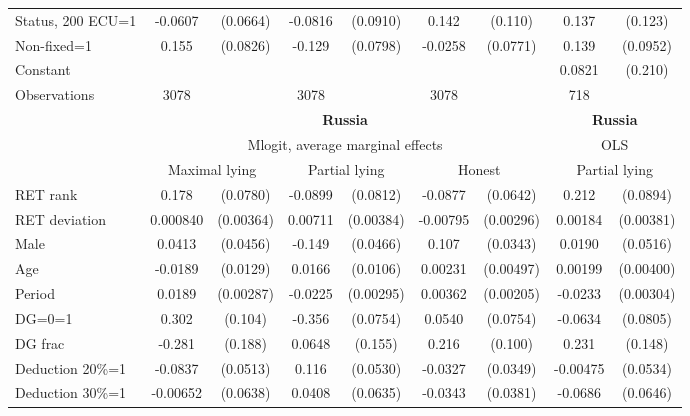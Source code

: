 \begin{tabular}{l|cccccc|cc}
Status, 200 ECU=1&  -0.0607         & (0.0664)&  -0.0816         & (0.0910)&    0.142         &  (0.110)&    0.137         &  (0.123)\\
Non-fixed=1     &    0.155\sym{*}  & (0.0826)&   -0.129         & (0.0798)&  -0.0258         & (0.0771)&    0.139         & (0.0952)\\
Constant        &                  &         &                  &         &                  &         &   0.0821         &  (0.210)\\
\hline
Observations    &     3078         &         &     3078         &         &     3078         &         &      718         &         \\
\hline\hline
&\multicolumn{6}{c|}{\bf Russia}&\multicolumn{2}{c}{\bf Russia}\\ &\multicolumn{6}{c|}{Mlogit, average marginal effects }&\multicolumn{2}{c}{OLS}\\
                &\multicolumn{2}{c}{Maximal lying}&\multicolumn{2}{c}{Partial lying}&\multicolumn{2}{c}{Honest}  &\multicolumn{2}{c}{Partial lying}\\
\hline
RET rank        &    0.178\sym{**} & (0.0780)&  -0.0899         & (0.0812)&  -0.0877         & (0.0642)&    0.212\sym{**} & (0.0894)\\
RET deviation   & 0.000840         &(0.00364)&  0.00711\sym{*}  &(0.00384)& -0.00795\sym{***}&(0.00296)&  0.00184         &(0.00381)\\
Male            &   0.0413         & (0.0456)&   -0.149\sym{***}& (0.0466)&    0.107\sym{***}& (0.0343)&   0.0190         & (0.0516)\\
Age             &  -0.0189         & (0.0129)&   0.0166         & (0.0106)&  0.00231         &(0.00497)&  0.00199         &(0.00400)\\
Period          &   0.0189\sym{***}&(0.00287)&  -0.0225\sym{***}&(0.00295)&  0.00362\sym{*}  &(0.00205)&  -0.0233\sym{***}&(0.00304)\\
DG=0=1          &    0.302\sym{***}&  (0.104)&   -0.356\sym{***}& (0.0754)&   0.0540         & (0.0754)&  -0.0634         & (0.0805)\\
DG frac         &   -0.281         &  (0.188)&   0.0648         &  (0.155)&    0.216\sym{**} &  (0.100)&    0.231         &  (0.148)\\
Deduction 20\%=1&  -0.0837         & (0.0513)&    0.116\sym{**} & (0.0530)&  -0.0327         & (0.0349)& -0.00475         & (0.0534)\\
Deduction 30\%=1& -0.00652         & (0.0638)&   0.0408         & (0.0635)&  -0.0343         & (0.0381)&  -0.0686         & (0.0646)\\

\end{tabular}
